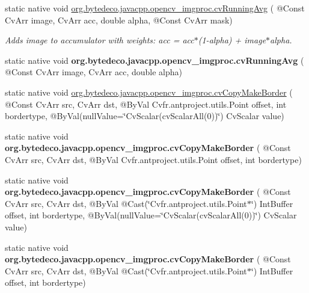 \begin{DoxyCompactItemize}
\item 
static native void \hyperlink{group__imgproc__c_gaf06fc48b42683511a2fc75d1fe34b2e8}{org.\+bytedeco.\+javacpp.\+opencv\+\_\+imgproc.\+cv\+Running\+Avg} ( @Const Cv\+Arr image, Cv\+Arr acc, double alpha, @Const Cv\+Arr mask)
\begin{DoxyCompactList}\small\item\em Adds image to accumulator with weights\+: acc = acc$\ast$(1-\/alpha) + image$\ast$alpha. \end{DoxyCompactList}\item 
\mbox{\label{group__imgproc__c_gaab6cdf4dc3ff277c6595ed819fc63ff9}} 
static native void {\bfseries org.\+bytedeco.\+javacpp.\+opencv\+\_\+imgproc.\+cv\+Running\+Avg} ( @Const Cv\+Arr image, Cv\+Arr acc, double alpha)
\item 
static native void \hyperlink{group__imgproc__c_ga46ab19adc04378f8728b90f45240f5da}{org.\+bytedeco.\+javacpp.\+opencv\+\_\+imgproc.\+cv\+Copy\+Make\+Border} ( @Const Cv\+Arr src, Cv\+Arr dst, @By\+Val Cv\+fr.antproject.utils.Point offset, int bordertype, @By\+Val(null\+Value=\char`\"{}Cv\+Scalar(cv\+Scalar\+All(0))\char`\"{}) Cv\+Scalar value)
\item 
\mbox{\label{group__imgproc__c_gaca27fb0b9051c3c1cf968c809e1778de}} 
static native void {\bfseries org.\+bytedeco.\+javacpp.\+opencv\+\_\+imgproc.\+cv\+Copy\+Make\+Border} ( @Const Cv\+Arr src, Cv\+Arr dst, @By\+Val Cv\+fr.antproject.utils.Point offset, int bordertype)
\item 
\mbox{\label{group__imgproc__c_gafd7c5d632e51cf1e80f518dc37cee41f}} 
static native void {\bfseries org.\+bytedeco.\+javacpp.\+opencv\+\_\+imgproc.\+cv\+Copy\+Make\+Border} ( @Const Cv\+Arr src, Cv\+Arr dst, @By\+Val @Cast(\char`\"{}Cv\+fr.antproject.utils.Point$\ast$\char`\"{}) Int\+Buffer offset, int bordertype, @By\+Val(null\+Value=\char`\"{}Cv\+Scalar(cv\+Scalar\+All(0))\char`\"{}) Cv\+Scalar value)
\item 
\mbox{\label{group__imgproc__c_gac620224b5625099957b53c0df9a09744}} 
static native void {\bfseries org.\+bytedeco.\+javacpp.\+opencv\+\_\+imgproc.\+cv\+Copy\+Make\+Border} ( @Const Cv\+Arr src, Cv\+Arr dst, @By\+Val @Cast(\char`\"{}Cv\+fr.antproject.utils.Point$\ast$\char`\"{}) Int\+Buffer offset, int bordertype)
\item 

\end{DoxyCompactItemize}
